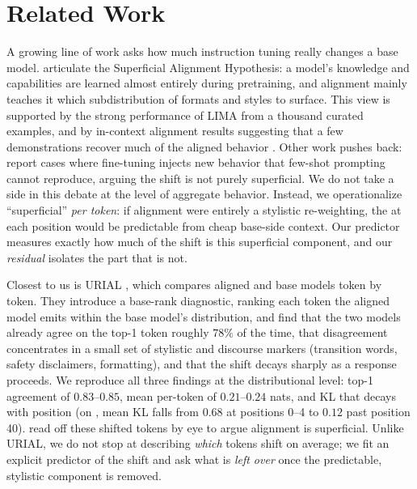 \section{Related Work}\label{sec:related}

 A growing line of work asks how
much instruction tuning really changes a base model. \citet{zhou2023lima}
articulate the Superficial Alignment Hypothesis: a model's knowledge and
capabilities are learned almost entirely during pretraining, and alignment
mainly teaches it which subdistribution of formats and styles to surface. This
view is supported by the strong performance of LIMA from a thousand curated
examples, and by in-context alignment results suggesting that a few
demonstrations recover much of the aligned behavior \citep{zhao2024iclsufficient,
lin2023urial}. Other work pushes back: \citet{revisiting2024superficial} report
cases where fine-tuning injects new behavior that few-shot prompting cannot
reproduce, arguing the shift is not purely superficial. We do not take a side in
this debate at the level of aggregate behavior. Instead, we operationalize
``superficial'' \emph{per token}: if alignment were entirely a stylistic
re-weighting, the \klt{} at each position would be predictable from cheap
base-side context. Our \gbt{} predictor measures exactly how much of the shift is
this superficial component, and our \emph{residual} isolates the part that is
not.

 Closest to us is URIAL
\citep{lin2023urial}, which compares aligned and base models token by token. They
introduce a base-rank diagnostic, ranking each token the aligned model emits
within the base model's distribution, and find that the two models already agree
on the top-1 token roughly $78\%$ of the time, that disagreement concentrates in
a small set of stylistic and discourse markers (transition words, safety
disclaimers, formatting), and that the shift decays sharply as a response
proceeds. We reproduce all three findings at the distributional level: top-1
agreement of $0.83$--$0.85$, mean per-token \klt{} of $0.21$--$0.24$ nats, and KL
that decays with position (on \qwensmall{}, mean KL falls from $0.68$ at
positions 0--4 to $0.12$ past position 40). \citet{lin2023urial} read off these
shifted tokens by eye to argue alignment is superficial. Unlike URIAL, we do not
stop at describing \emph{which} tokens shift on average; we fit an explicit
predictor of the shift and ask what is \emph{left over} once the predictable,
stylistic component is removed.


